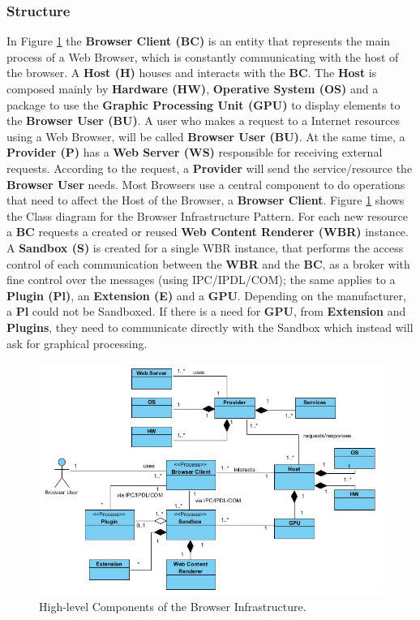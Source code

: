 \documentclass{sig-alternate-05-2015}
\begin{document}
    \subsubsection*{Structure}
    In Figure \ref{fig:BIPatt} the \textbf{Browser Client (BC)} is an entity that represents the main process of a Web Browser, which is constantly communicating with the host of the browser. A \textbf{Host (H)} houses and interacts with the \textbf{BC}. The \textbf{Host} is composed mainly by \textbf{Hardware (HW)}, \textbf{Operative System (OS)} and a package to use the \textbf{Graphic Processing Unit (GPU)} to display elements to the \textbf{Browser User (BU)}. A user who makes a request to a Internet resources using a Web Browser, will be called \textbf{Browser User (BU)}. At the same time, a \textbf{Provider (P)} has a \textbf{Web Server (WS)} responsible for receiving external requests. According to the request, a \textbf{Provider} will send the service/resource the \textbf{Browser User} needs. Most Browsers use a central component to do operations that need to affect the Host of the Browser, a \textbf{Browser Client}. Figure \ref{fig:BIPatt} shows the Class diagram for the Browser Infrastructure Pattern. For each new resource a \textbf{BC} requests a created or reused \textbf{Web Content Renderer (WBR)} instance. A \textbf{Sandbox (S)} is created for a single WBR instance, that performs the access control of each communication between the \textbf{WBR} and the \textbf{BC}, as a broker with fine control over the messages (using IPC/IPDL/COM); the same applies to a \textbf{Plugin (Pl)}, an \textbf{Extension (E)} and a \textbf{GPU}. Depending on the manufacturer, a \textbf{Pl} could not be Sandboxed. If there is a need for \textbf{GPU}, from \textbf{Extension} and \textbf{Plugins}, they need to communicate directly with the Sandbox which instead will ask for graphical processing.

    \begin{figure}[h!t]
      \centering
      \includegraphics[scale=0.85]{figures/patron_v6.jpg}
      \caption{High-level Components of the Browser Infrastructure.}
      \label{fig:BIPatt}
    \end{figure}
\end{document}
